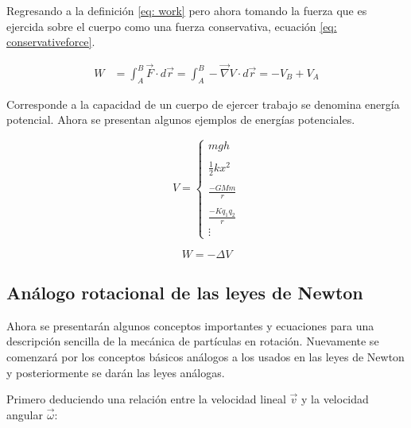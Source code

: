 \documentclass[/home/hernan/Documentos/Apuntes_mecanica_teorica/main.tex]{subfiles}
\begin{document}
	Regresando a la definición \ref{eq: work} pero ahora tomando la fuerza que es ejercida sobre el cuerpo como una fuerza conservativa, ecuación \ref{eq: conservativeforce}.

	\begin{align*}
		W &= \int_{A}^{B} \vec{F} \cdot d\vec{r} =  \int_{A}^{B} - \vec{\nabla}V \cdot d\vec{r} = -V_{B} + V_{A}
	\end{align*}

	\begin{definition} Corresponde a la capacidad de un cuerpo de ejercer trabajo se denomina energía potencial. Ahora se presentan algunos ejemplos de energías potenciales.

		\begin{equation}
			V = \left \{ \begin{matrix}
				mgh\\ 
				\\
				\frac{1}{2}kx^{2} \\
				\\
				\frac{-GMm}{r}\\ 
				\\
				\frac{-Kq_{1}q_{2}}{r}\\ 
				\vdots 
				\end{matrix} \right .
		\end{equation}
		
	\end{definition}

	\begin{theorem}

		\begin{equation}
			W = - \Delta V
			\label{eq: workV}
		\end{equation}
		
	\end{theorem}

	\subsection{Análogo rotacional de las leyes de Newton}

	Ahora se presentarán algunos conceptos importantes y ecuaciones para una descripción sencilla de la mecánica de partículas en rotación. Nuevamente se comenzará por los conceptos básicos análogos a los usados en las leyes de Newton y posteriormente se darán las leyes análogas.

	Primero deduciendo una relación entre la velocidad lineal $\vec{v}$ y la velocidad angular $\vec{\omega}$:
\end{document}
